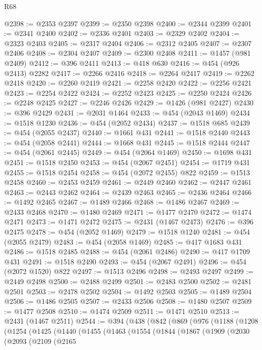 \begin{lexlean}{R68}
\begin{coremodule}
@2398 := @2353 @2397
@2399 := @2350 @2398
@2400 := @2344 @2399
@2401 := @2341 @2400
@2402 := @2336 @2401
@2403 := @2329 @2402
@2404 := @2323 @2403
@2405 := @2317 @2404
@2406 := @2312 @2405
@2407 := @2307 @2406
@2408 := @2304 @2407
@2409 := @2300 @2408
@2411 := @1457 (@981 @2409)
@2412 := @396 @2411
@2413 := @418 @630
@2416 := @454 (@926 @2413) @2282
@2417 := @2266 @2416
@2418 := @2264 @2417
@2419 := @2262 @2418
@2420 := @2260 @2419
@2421 := @2258 @2420
@2422 := @2256 @2421
@2423 := @2254 @2422
@2424 := @2252 @2423
@2425 := @2250 @2424
@2426 := @2248 @2425
@2427 := @2246 @2426
@2429 := @1426 (@981 @2427)
@2430 := @396 @2429
@2431 := @2031 @1464
@2433 := @454 (@2043 @1469)
@2434 := @1518 @1230
@2436 := @454 (@2052 @2434)
@2437 := @1518 @685
@2439 := @454 (@2055 @2437)
@2440 := @1661 @431
@2441 := @1518 @2440
@2443 := @454 (@2058 @2441)
@2444 := @1668 @431
@2445 := @1518 @2444
@2447 := @454 (@2061 @2445)
@2449 := @454 (@2064 @1469)
@2450 := @1698 @431
@2451 := @1518 @2450
@2453 := @454 (@2067 @2451)
@2454 := @1719 @431
@2455 := @1518 @2454
@2458 := @454 (@2072 @2455) @822
@2459 := @1513 @2458
@2460 := @2453 @2459
@2461 := @2449 @2460
@2462 := @2447 @2461
@2463 := @2443 @2462
@2464 := @2439 @2463
@2465 := @2436 @2464
@2466 := @1492 @2465
@2467 := @1489 @2466
@2468 := @1486 @2467
@2469 := @2433 @2468
@2470 := @1480 @2469
@2471 := @1477 @2470
@2472 := @1474 @2471
@2473 := @1471 @2472
@2475 := @2431 (@1467 @2473)
@2476 := @396 @2475
@2478 := @454 (@2052 @1469)
@2479 := @1518 @1240
@2481 := @454 (@2055 @2479)
@2483 := @454 (@2058 @1469)
@2485 := @417 @1683 @431
@2486 := @1518 @2485
@2488 := @454 (@2061 @2486)
@2490 := @417 @1709 @431
@2491 := @1518 @2490
@2493 := @454 (@2067 @2491)
@2496 := @454 (@2072 @1520) @822
@2497 := @1513 @2496
@2498 := @2493 @2497
@2499 := @2449 @2498
@2500 := @2488 @2499
@2501 := @2483 @2500
@2502 := @2481 @2501
@2503 := @2478 @2502
@2504 := @1492 @2503
@2505 := @1489 @2504
@2506 := @1486 @2505
@2507 := @2433 @2506
@2508 := @1480 @2507
@2509 := @1477 @2508
@2510 := @1474 @2509
@2511 := @1471 @2510
@2513 := @2431 (@1467 @2511)
@2544 := @394
    (@438
      (@842
        (@869
          (@976
            (@1188
              (@1208
                (@1254
                  (@1425
                    (@1440
                      (@1455
                        (@1463
                          (@1554
                            (@1844
                              (@1867
                                (@1909
                                  (@2030
                                    (@2093
                                      (@2109
                                        (@2165

\end{coremodule}
\end{lexlean}
